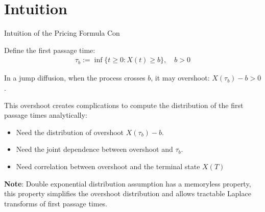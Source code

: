 \documentclass{beamer}
\begin{document}
\section{Intuition}
\begin{frame}{Intuition of the Pricing Formula Con}


     {\footnotesize \footnotesize
    \par Define the first passage time:
    \begin{align*}
        \tau_{b} := \inf\{t \geq 0 : X(t) \geq b\}, \quad b > 0
    \end{align*}
    \par In a jump diffusion, when the process crosses \( b \), it may overshoot: $X(\tau_{b}) - b > 0$.
    \vspace{1em}
    \par  \pause This overshoot creates complications to compute the distribution of the first passage
times analytically: 
    \begin{itemize}
        \item Need the distribution of overshoot \( X(\tau_{b}) - b \).
        \item Need the joint dependence between overshoot and \( \tau_{b} \).
        \item Need correlation between overshoot and the terminal state \( X(T) \)
    \end{itemize}
    \vspace{1em}
    \par  \pause \textbf{Note}: Double exponential distribution assumption has a memoryless property, this property 
    simplifies the overshoot distribution and allows tractable Laplace transforms of first passage times.
    }
    
\end{frame}
\end{document}

